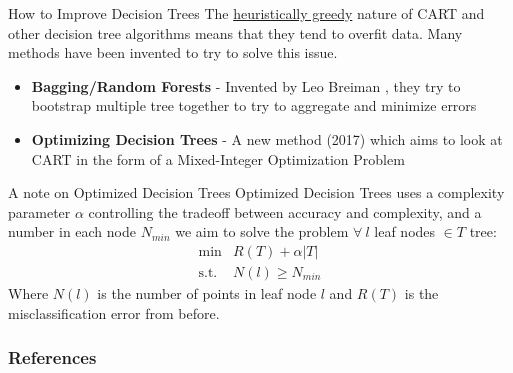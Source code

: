 \documentclass[12pt]{beamer}
\begin{document}
\begin{frame}{How to Improve Decision Trees}
    The \underline{heuristically greedy} nature of CART and other decision tree algorithms means that they tend to overfit data. 
    Many methods have been invented to try to solve this issue.
    \begin{itemize}
        \item<1-> \textbf{Bagging/Random Forests} - Invented by Leo Breiman \cite{randomforest}, they try to bootstrap multiple tree together to try to aggregate and minimize errors
        
        \item<2-> \textbf{Optimizing Decision Trees} - A new method (2017) \cite{oct} which aims to look at CART in the form of a Mixed-Integer Optimization Problem
    \end{itemize}
\end{frame}

\begin{frame}{A note on Optimized Decision Trees}
Optimized Decision Trees \cite{oct} uses a complexity parameter $\alpha$ controlling the tradeoff between accuracy and complexity, and a number in each node $N_{min}$ we aim to solve the problem $\forall \ l$ leaf nodes $ \in T$ tree:
\[ \begin{array}{cc}
        \min  & R(T) + \alpha \left|T\right|\\
        \text{s.t.}  & N(l) \geq N_{min}
    \end{array} \]
Where $N(l)$ is the number of points in leaf node $l$ and $R(T)$ is the misclassification error from before.
\end{frame}

\begin{frame}[allowframebreaks]
        \frametitle{References}
        
        
\end{frame}
\end{document}
